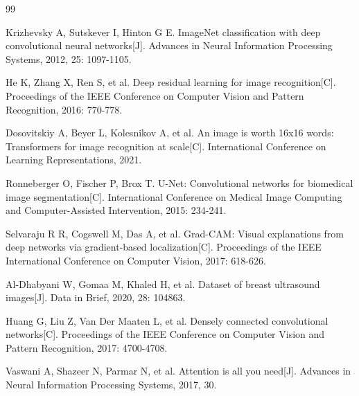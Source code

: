 \documentclass[supercite]{Hust-undergraduate-kaiti}
\theoremstyle{definition}
\begin{document}
\begin{thebibliography}{99}

 Krizhevsky A, Sutskever I, Hinton G E. ImageNet classification with deep convolutional neural networks[J]. Advances in Neural Information Processing Systems, 2012, 25: 1097-1105.

 He K, Zhang X, Ren S, et al. Deep residual learning for image recognition[C]. Proceedings of the IEEE Conference on Computer Vision and Pattern Recognition, 2016: 770-778.

 Dosovitskiy A, Beyer L, Kolesnikov A, et al. An image is worth 16x16 words: Transformers for image recognition at scale[C]. International Conference on Learning Representations, 2021.

 Ronneberger O, Fischer P, Brox T. U-Net: Convolutional networks for biomedical image segmentation[C]. International Conference on Medical Image Computing and Computer-Assisted Intervention, 2015: 234-241.

 Selvaraju R R, Cogswell M, Das A, et al. Grad-CAM: Visual explanations from deep networks via gradient-based localization[C]. Proceedings of the IEEE International Conference on Computer Vision, 2017: 618-626.

 Al-Dhabyani W, Gomaa M, Khaled H, et al. Dataset of breast ultrasound images[J]. Data in Brief, 2020, 28: 104863.

 Huang G, Liu Z, Van Der Maaten L, et al. Densely connected convolutional networks[C]. Proceedings of the IEEE Conference on Computer Vision and Pattern Recognition, 2017: 4700-4708.

 Vaswani A, Shazeer N, Parmar N, et al. Attention is all you need[J]. Advances in Neural Information Processing Systems, 2017, 30.

\end{thebibliography}
\end{document}
